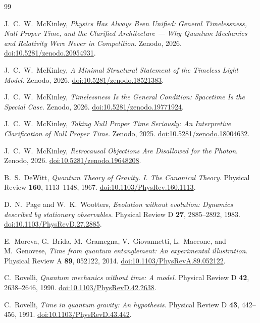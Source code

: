 \documentclass[12pt,onecolumn]{article}
\theoremstyle{plain}
\theoremstyle{definition}
\theoremstyle{remark}
\begin{document}
\begin{thebibliography}{99}

J.~C.~W.~McKinley,
\textit{Physics Has Always Been Unified:
General Timelessness, Null Proper Time, and the Clarified Architecture ---
Why Quantum Mechanics and Relativity Were Never in Competition}.
Zenodo, 2026.
\href{https://doi.org/10.5281/zenodo.20954931}
{doi:10.5281/zenodo.20954931}.

J.~C.~W.~McKinley,
\textit{A Minimal Structural Statement of the Timeless Light Model}.
Zenodo, 2026.
\href{https://doi.org/10.5281/zenodo.18521383}
{doi:10.5281/zenodo.18521383}.

J.~C.~W.~McKinley,
\textit{Timelessness Is the General Condition:
Spacetime Is the Special Case}.
Zenodo, 2026.
\href{https://doi.org/10.5281/zenodo.19771924}
{doi:10.5281/zenodo.19771924}.

J.~C.~W.~McKinley,
\textit{Taking Null Proper Time Seriously:
An Interpretive Clarification of Null Proper Time}.
Zenodo, 2025.
\href{https://doi.org/10.5281/zenodo.18004632}
{doi:10.5281/zenodo.18004632}.

J.~C.~W.~McKinley,
\textit{Retrocausal Objections Are Disallowed for the Photon}.
Zenodo, 2026.
\href{https://doi.org/10.5281/zenodo.19648208}
{doi:10.5281/zenodo.19648208}.

B.~S.~DeWitt,
\textit{Quantum Theory of Gravity. I. The Canonical Theory}.
Physical Review \textbf{160}, 1113--1148, 1967.
\href{https://doi.org/10.1103/PhysRev.160.1113}
{doi:10.1103/PhysRev.160.1113}.

D.~N.~Page and W.~K.~Wootters,
\textit{Evolution without evolution:
Dynamics described by stationary observables}.
Physical Review D \textbf{27}, 2885--2892, 1983.
\href{https://doi.org/10.1103/PhysRevD.27.2885}
{doi:10.1103/PhysRevD.27.2885}.

E.~Moreva, G.~Brida, M.~Gramegna, V.~Giovannetti,
L.~Maccone, and M.~Genovese,
\textit{Time from quantum entanglement:
An experimental illustration}.
Physical Review A \textbf{89}, 052122, 2014.
\href{https://doi.org/10.1103/PhysRevA.89.052122}
{doi:10.1103/PhysRevA.89.052122}.

C.~Rovelli,
\textit{Quantum mechanics without time: A model}.
Physical Review D \textbf{42}, 2638--2646, 1990.
\href{https://doi.org/10.1103/PhysRevD.42.2638}
{doi:10.1103/PhysRevD.42.2638}.

C.~Rovelli,
\textit{Time in quantum gravity: An hypothesis}.
Physical Review D \textbf{43}, 442--456, 1991.
\href{https://doi.org/10.1103/PhysRevD.43.442}
{doi:10.1103/PhysRevD.43.442}.

\end{thebibliography}
\end{document}
